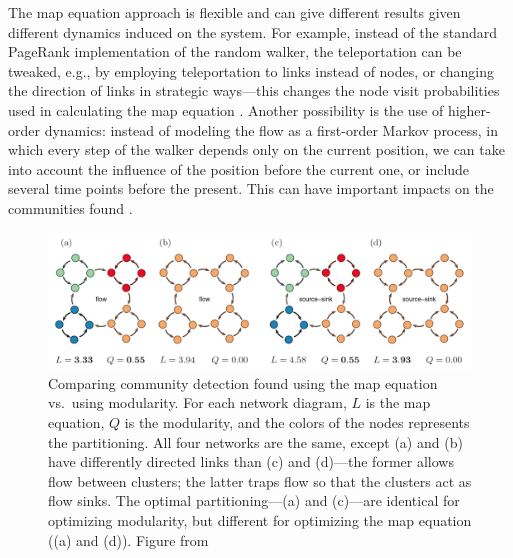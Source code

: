 The map equation approach is flexible and can give different results
given different dynamics induced on the system. For example, instead of
the standard PageRank implementation of the random walker, the
teleportation can be tweaked, e.g., by employing teleportation to links
instead of nodes, or changing the direction of links in strategic
ways---this changes the node visit probabilities used in calculating the
map equation \autocite{lambiotte_ranking_2012}. Another possibility is
the use of higher-order dynamics: instead of modeling the flow as a
first-order Markov process, in which every step of the walker depends
only on the current position, we can take into account the influence of
the position before the current one, or include several time points
before the present. This can have important impacts on the communities
found \autocite{rosvall_memory_2014}.

\begin{figure}
\centering
\includegraphics{img/rosvall2010_fig3_mapvsmodularity.png}
\caption{Comparing community detection found using the map equation
vs.~using modularity. For each network diagram, \(L\) is the map
equation, \(Q\) is the modularity, and the colors of the nodes
represents the partitioning. All four networks are the same, except (a)
and (b) have differently directed links than (c) and (d)---the former
allows flow between clusters; the latter traps flow so that the clusters
act as flow sinks. The optimal partitioning---(a) and (c)---are
identical for optimizing modularity, but different for optimizing the
map equation ((a) and (d)). Figure from
\autocite{rosvall_map_2010}}\label{fig:mapvsmod}
\end{figure}

